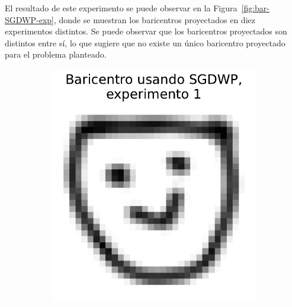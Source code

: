 El resultado de este experimento se puede observar en la Figura~\ref{fig:bar-SGDWP-exp}, donde se muestran los baricentros proyectados en diez experimentos distintos. Se puede observar que los baricentros proyectados son distintos entre sí, lo que sugiere que no existe un único baricentro proyectado para el problema planteado.
\begin{figure}[H]
    \centering
    \begin{subfigure}[b]{0.17\textwidth}
        \centering
        \includegraphics[width=\textwidth]{img/sgdwp/bar-SGDWP-exp-01.pdf}
        \label{fig:bar-SGDWP-exp-01}
    \end{subfigure}
    \hfill
    \begin{subfigure}[b]{0.17\textwidth}
        \centering

\end{subfigure}
\end{figure}
